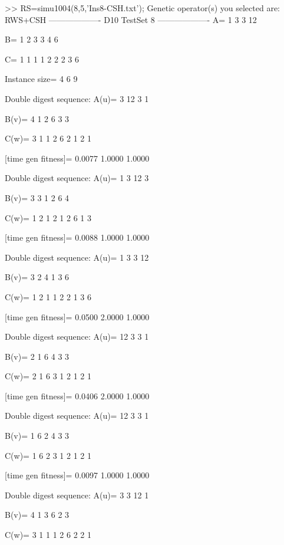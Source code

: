 >> RS=simu1004(8,5,'Ins8-CSH.txt');
Genetic operator(s) you selected are:
RWS+CSH
------------------- D10 TestSet 8 -------------------
A=
     1     3     3    12

B=
     1     2     3     3     4     6

C=
     1     1     1     1     2     2     2     3     6

Instance size=
     4     6     9

Double digest sequence:
A(u)=
     3    12     3     1

B(v)=
     4     1     2     6     3     3

C(w)=
     3     1     1     2     6     2     1     2     1

[time gen fitness]=
    0.0077    1.0000    1.0000

Double digest sequence:
A(u)=
     1     3    12     3

B(v)=
     3     3     1     2     6     4

C(w)=
     1     2     1     2     1     2     6     1     3

[time gen fitness]=
    0.0088    1.0000    1.0000

Double digest sequence:
A(u)=
     1     3     3    12

B(v)=
     3     2     4     1     3     6

C(w)=
     1     2     1     1     2     2     1     3     6

[time gen fitness]=
    0.0500    2.0000    1.0000

Double digest sequence:
A(u)=
    12     3     3     1

B(v)=
     2     1     6     4     3     3

C(w)=
     2     1     6     3     1     2     1     2     1

[time gen fitness]=
    0.0406    2.0000    1.0000

Double digest sequence:
A(u)=
    12     3     3     1

B(v)=
     1     6     2     4     3     3

C(w)=
     1     6     2     3     1     2     1     2     1

[time gen fitness]=
    0.0097    1.0000    1.0000

Double digest sequence:
A(u)=
     3     3    12     1

B(v)=
     4     1     3     6     2     3

C(w)=
     3     1     1     1     2     6     2     2     1

